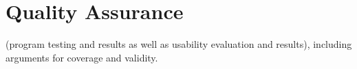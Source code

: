 \chapter{Quality Assurance}
(program testing and results as well as usability evaluation and results), including arguments for coverage and validity.